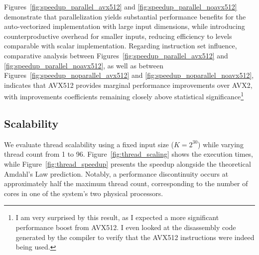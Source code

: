 \documentclass[10pt]{report}
\begin{document}
Figures~\ref{fig:speedup_parallel_avx512} and \ref{fig:speedup_parallel_noavx512} demonstrate that parallelization yields substantial performance benefits for the auto-vectorized implementation with large input dimensions, while introducing counterproductive overhead for smaller inputs, reducing efficiency to levels comparable with scalar implementation. Regarding instruction set influence, comparative analysis between Figures~\ref{fig:speedup_parallel_avx512} and \ref{fig:speedup_parallel_noavx512}, as well as between Figures~\ref{fig:speedup_noparallel_avx512} and \ref{fig:speedup_noparallel_noavx512}, indicates that AVX512 provides marginal performance improvements over AVX2, with improvements coefficients remaining closely above statistical significance\footnote{I am very surprised by this result, as I expected a more significant performance boost from AVX512. I even looked at the disassembly code generated by the compiler to verify that the AVX512 instructions were indeed being used.}

\subsection*{Scalability}

We evaluate thread scalability using a fixed input size ($K = 2^{30}$) while varying thread count from 1 to 96. Figure~\ref{fig:thread_scaling} shows the execution times, while Figure~\ref{fig:thread_speedup} presents the speedup alongside the theoretical Amdahl's Law prediction. Notably, a performance discontinuity occurs at approximately half the maximum thread count, corresponding to the number of cores in one of the system's two physical processors.
\end{document}
